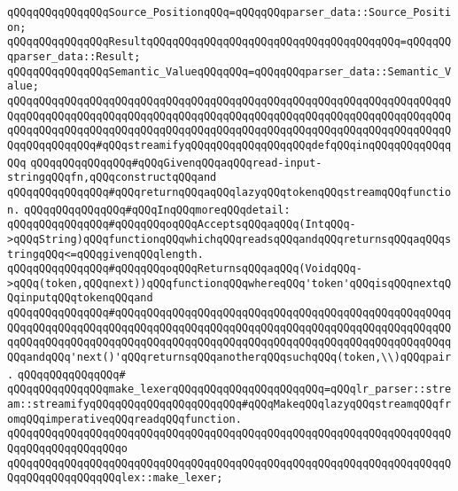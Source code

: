 \verb|qQQqqQQqqQQqqQQqSource_PositionqQQq=qQQqqQQqparser_data::Source_Position;|\newline
\verb|qQQqqQQqqQQqqQQqResultqQQqqQQqqQQqqQQqqQQqqQQqqQQqqQQqqQQqqQQq=qQQqqQQqparser_data::Result;|\newline
\verb|qQQqqQQqqQQqqQQqSemantic_ValueqQQqqQQq=qQQqqQQqparser_data::Semantic_Value;|\newline
\newline
\verb|qQQqqQQqqQQqqQQqqQQqqQQqqQQqqQQqqQQqqQQqqQQqqQQqqQQqqQQqqQQqqQQqqQQqqQQqqQQqqQQqqQQqqQQqqQQqqQQqqQQqqQQqqQQqqQQqqQQqqQQqqQQqqQQqqQQqqQQqqQQqqQQqqQQqqQQqqQQqqQQqqQQqqQQqqQQqqQQqqQQqqQQqqQQqqQQqqQQqqQQqqQQqqQQqqQQqqQQqqQQqqQQq#qQQqstreamifyqQQqqQQqqQQqqQQqqQQqdefqQQqinqQQqqQQqqQQqqQQq|\newline
\newline
\verb|qQQqqQQqqQQqqQQq#qQQqGivenqQQqaqQQqread-input-stringqQQqfn,qQQqconstructqQQqand|\newline
\verb|qQQqqQQqqQQqqQQq#qQQqreturnqQQqaqQQqlazyqQQqtokenqQQqstreamqQQqfunction.|\newline
\verb|qQQqqQQqqQQqqQQq#qQQqInqQQqmoreqQQqdetail:|\newline
\verb|qQQqqQQqqQQqqQQq#qQQqqQQqoqQQqAcceptsqQQqaqQQq(IntqQQq->qQQqString)qQQqfunctionqQQqwhichqQQqreadsqQQqandqQQqreturnsqQQqaqQQqstringqQQq<=qQQqgivenqQQqlength.|\newline
\verb|qQQqqQQqqQQqqQQq#qQQqqQQqoqQQqReturnsqQQqaqQQq(VoidqQQq->qQQq(token,qQQqnext))qQQqfunctionqQQqwhereqQQq'token'qQQqisqQQqnextqQQqinputqQQqtokenqQQqand|\newline
\verb|qQQqqQQqqQQqqQQq#qQQqqQQqqQQqqQQqqQQqqQQqqQQqqQQqqQQqqQQqqQQqqQQqqQQqqQQqqQQqqQQqqQQqqQQqqQQqqQQqqQQqqQQqqQQqqQQqqQQqqQQqqQQqqQQqqQQqqQQqqQQqqQQqqQQqqQQqqQQqqQQqqQQqqQQqqQQqqQQqqQQqqQQqqQQqqQQqqQQqqQQqqQQqqQQqqQQqandqQQq'next()'qQQqreturnsqQQqanotherqQQqsuchqQQq(token,\\)qQQqpair.|\newline
\verb|qQQqqQQqqQQqqQQq#|\newline
\verb|qQQqqQQqqQQqqQQqmake_lexerqQQqqQQqqQQqqQQqqQQqqQQq=qQQqlr_parser::stream::streamifyqQQqqQQqqQQqqQQqqQQqqQQq#qQQqMakeqQQqlazyqQQqstreamqQQqfromqQQqimperativeqQQqreadqQQqfunction.|\newline
\verb|qQQqqQQqqQQqqQQqqQQqqQQqqQQqqQQqqQQqqQQqqQQqqQQqqQQqqQQqqQQqqQQqqQQqqQQqqQQqqQQqqQQqqQQqo|\newline
\verb|qQQqqQQqqQQqqQQqqQQqqQQqqQQqqQQqqQQqqQQqqQQqqQQqqQQqqQQqqQQqqQQqqQQqqQQqqQQqqQQqqQQqqQQqlex::make_lexer;|\newline
